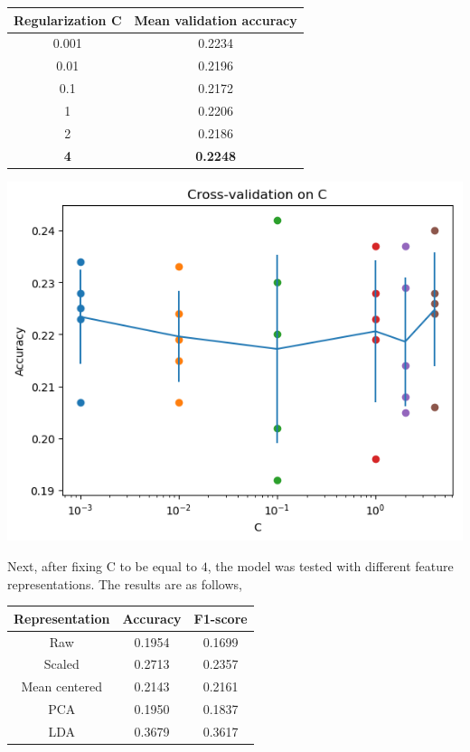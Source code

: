 \documentclass[12pt]{article}
\begin{document}
\begin{center}
\begin{tabular}{|c|c|}
 \hline
 Regularization C& Mean validation accuracy \\
 \hline
 0.001 & 0.2234\\
 0.01 & 0.2196\\
 0.1 & 0.2172\\
 1 & 0.2206\\
 2 & 0.2186\\
 \textbf{4} & \textbf{0.2248}\\
 \hline
\end{tabular}
\end{center}

\begin{center}
 \includegraphics[scale=0.5]{lsvm-c.png}
\end{center}

Next, after fixing C to be equal to $4$, the model was tested with different feature representations. The results are as follows,

\begin{center}
  \begin{tabular}{|c|c|c|}
    \hline
    Representation & Accuracy & F1-score \\
    \hline
    Raw & 0.1954 & 0.1699\\
    Scaled & 0.2713 & 0.2357\\
    Mean centered & 0.2143 & 0.2161\\
    PCA & 0.1950 & 0.1837\\
    LDA & 0.3679 & 0.3617 \\
    \hline
  \end{tabular}
\end{center}
\end{document}
